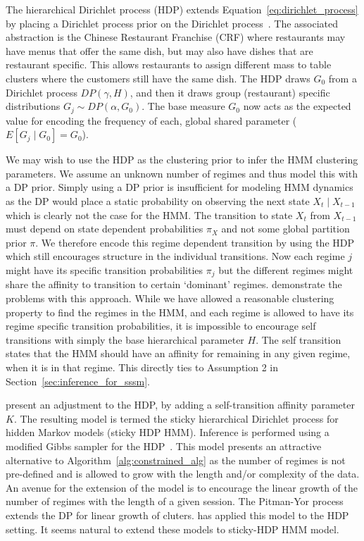 The hierarchical Dirichlet process (HDP) extends Equation~\ref{eq:dirichlet_process} by placing a Dirichlet process prior on the Dirichlet process~\citep{teh2005sharing}. The associated abstraction is the Chinese Restaurant Franchise (CRF) where restaurants may have menus that offer the same dish, but may also have dishes that are restaurant specific. This allows restaurants to assign different mass to table clusters where the customers still have the same dish. The HDP draws $G_0$ from a Dirichlet process $DP(\gamma, H)$, and then it draws group (restaurant) specific distributions $G_j \sim DP(\alpha, G_0)$. The base measure $G_0$ now acts as the expected value for encoding the frequency of each, global shared parameter ($E[G_j \mid G_0] = G_0$).

We may wish to use the HDP as the clustering prior to infer the HMM clustering parameters. We assume an unknown number of regimes and thus model this with a DP prior. Simply using a DP prior is insufficient for modeling HMM dynamics as the DP would place a static probability on observing the next state $X_t \mid X_{t-1}$ which is clearly not the case for the HMM. The transition to state $X_t$ from $X_{t-1}$ must depend on state dependent probabilities $\pi_X$ and not some global partition prior $\pi$. We therefore encode this regime dependent transition by using the HDP which still encourages structure in the individual transitions. Now each regime $j$ might have its specific transition probabilities $\pi_j$ but the different regimes might share the affinity to transition to certain `dominant' regimes. \cite{fox2009nonparametric, fox2007hierarchical} demonstrate the problems with this approach. While we have allowed a reasonable clustering property to find the regimes in the HMM, and each regime is allowed to have its regime specific transition probabilities, it is impossible to encourage self transitions with simply the base hierarchical parameter $H$. The self transition states that the HMM should have an affinity for remaining in any given regime, when it is in that regime. This directly ties to Assumption 2 in Section~\ref{sec:inference_for_sssm}.

\cite{fox2009nonparametric, fox2007hierarchical} present an adjustment to the HDP, by adding a self-transition affinity parameter $K$. The resulting model is termed the sticky hierarchical Dirichlet process for hidden Markov models (sticky HDP HMM). Inference is performed using a modified Gibbs sampler for the HDP~\cite{teh2005sharing}. This model presents an attractive alternative to Algorithm~\ref{alg:constrained_alg} as the number of regimes is not pre-defined and is allowed to grow with the length and/or complexity of the data. An avenue for the extension of the \citep{fox2009nonparametric} model is to encourage the linear growth of the number of regimes with the length of a given session. The Pitman-Yor process~\citep{pitman1997two} extends the DP for linear growth of cluters. \cite{teh2006hierarchical} has applied this model to the HDP setting. It seems natural to extend these models to \cite{fox2009nonparametric} sticky-HDP HMM model.

